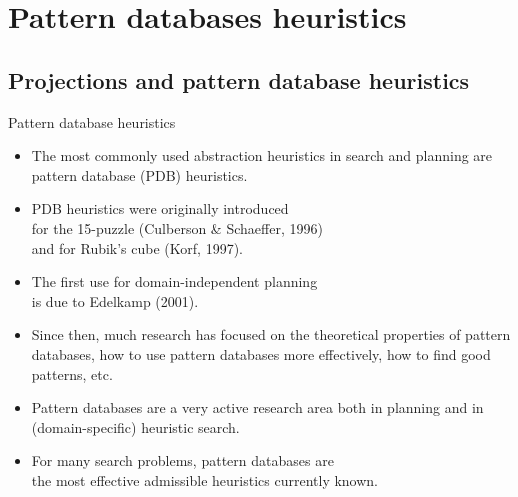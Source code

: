 \documentclass{gkibeamer}
\begin{document}
\subtitle{Planning as search: pattern database heuristics}
\date{December 13th, 2011}
\maketitles

\section[PDB heuristics]{Pattern databases heuristics}
\subsection[Projections]{Projections and pattern database heuristics}

\begin{frame}{Pattern database heuristics}
  \begin{itemize}
  \item The most commonly used abstraction heuristics in search and
    planning are \alert{pattern database (PDB) heuristics}.
  \item PDB heuristics were originally introduced \\
    for the \alert{15-puzzle} (Culberson \& Schaeffer, 1996) \\
    and for \alert{Rubik's cube} (Korf, 1997).
  \item The first use for \alert{domain-independent planning} \\
    is due to Edelkamp (2001).
  \item Since then, much research has focused on the theoretical
    properties of pattern databases, how to use pattern databases more
    effectively, how to find good patterns, etc.
  \item Pattern databases are a \alert{very active research area} both
    in planning and in (domain-specific) heuristic search.
  \item For many search problems, pattern databases are \\
    the \alert{most effective admissible heuristics} currently known.
  \end{itemize}
\end{frame}
\end{document}
